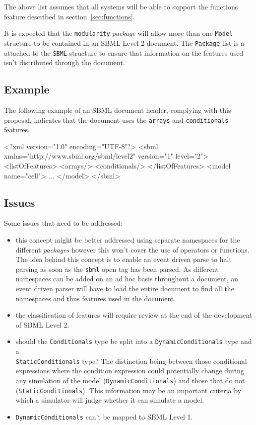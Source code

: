\documentclass{cekarticle}
\begin{document}
The above list assumes that all systems will be able to support
the functions feature described in section~\ref{sec:functions}.

It is expected that the \texttt{modularity} \emph{package} will allow
more than one \texttt{Model} structure to be contained in an SBML
Level 2 document.  The \texttt{Package} list is a attached to the
\texttt{SBML} structure to ensure that information on the features
used isn't distributed through the document.

\subsection{Example}

The following example of an SBML document header, complying with
this proposal, indicates that the document uses the \texttt{arrays} and
\texttt{conditionals} features.

\begin{example}
<?xml version="1.0" encoding="UTF-8"?>
<sbml xmlns="http://www.sbml.org/sbml/level2" version="1" level="2">
    <listOfFeatures>
        <arrays/>
        <conditionals/>
    </listOfFeatures>
    <model name="cell">
    ...
    </model>
</sbml>
\end{example}

\subsection{Issues}

Some issues that need to be addressed:
\begin{itemize}
\item this concept might be better addressed using separate
namespaces for the different \emph{packages} however this won't
cover the use of operators or functions.  The idea behind this concept is to
enable an event driven parse to halt parsing as soon as the
\texttt{sbml} open tag has been parsed.  As different namespaces
can be added on an ad hoc basis throughout a document, an event
driven parser will have to load the entire document to find all
the namespaces and thus features used in the document.

\item the classification of features will require review at the
end of the development of SBML Level 2.

\item should the \texttt{Conditionals} type be split into
a \texttt{DynamicConditionals} type and a \\
\texttt{StaticConditionals} type? The distinction being between
those conditional expressions where the condition expression
could potentially change during any simulation of the model
(\texttt{DynamicConditionals}) and those that do not
(\texttt{StaticConditionals}).  This information may be an
important criteria by which a simulator will judge whether it can
simulate a model.

\item \texttt{DynamicConditionals} can't be mapped to SBML Level 1.
\end{itemize}
\end{document}
